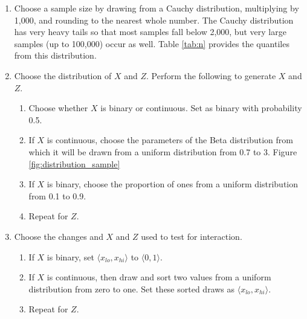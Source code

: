 \documentclass[12pt]{article}
\begin{document}
\begin{appendix}
\begin{enumerate}
        \item Choose a sample size by drawing from a Cauchy distribution, multiplying by 1,000, and rounding to the nearest whole number. The Cauchy distribution has very heavy tails so that most samples fall below 2,000, but very large samples (up to 100,000) occur as well. Table \ref{tab:n} provides the quantiles from this distribution.
        
        \item Choose the distribution of $X$ and $Z$. Perform the following to generate $X$ and $Z$.
                \begin{enumerate}
                \item Choose whether $X$ is binary or continuous. Set as binary with probability 0.5.
                \item If $X$ is continuous, choose the parameters of the Beta distribution from which it will be drawn from a uniform distribution from 0.7 to 3. Figure \ref{fig:distribution_sample}
                \item If $X$ is binary, choose the proportion of ones from a uniform distribution from 0.1 to 0.9.
                \item Repeat for $Z$.
                \end{enumerate}
                
        \item Choose the changes and $X$ and $Z$ used to test for interaction.
                \begin{enumerate}
                \item If $X$ is binary, set $\langle x_{lo}, x_{hi} \rangle$ to $\langle 0, 1 \rangle$.
                \item If $X$ is continuous, then draw and sort two values from a uniform distribution from zero to one. Set these sorted draws as $\langle x_{lo}, x_{hi} \rangle$.
                \item Repeat for $Z$.
                \end{enumerate}
\end{enumerate}



\end{appendix}
\end{document}
